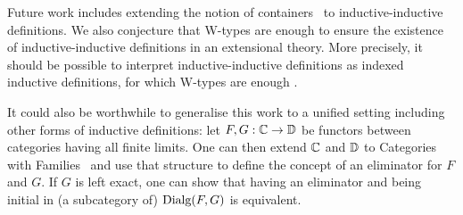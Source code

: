 \documentclass[orivec,envcountsame, ,envcountsect]{llncs}
\begin{document}
Future work includes extending the notion of
containers~\cite{abbottAltenkirchGhani2005containers} to
inductive-inductive definitions. We also conjecture that W-types are
enough to ensure the existence of inductive-inductive definitions in
an extensional theory. More precisely, it should be possible to
interpret inductive-inductive definitions as indexed inductive
definitions, for which W-types are enough
\cite{altenkirchMorris2009indexedCont}.

It could also be worthwhile to generalise this work to a unified setting
including other forms of inductive definitions: let $F, G: \mathbb{C} \to \mathbb{D}$
be functors between categories having all finite limits. One can then
extend $\mathbb{C}$ and $\mathbb{D}$ to Categories with
Families~\cite{dybjer1996internalTT,hofmann1997syntaxsemantics} and
use that structure to define the concept of an eliminator for $F$ and
$G$. If $G$ is left exact, one can show that having an eliminator and
being initial in (a subcategory of) $\text{Dialg}(F, G)$ is equivalent.





\end{document}
